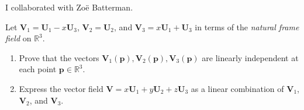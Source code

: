 \documentclass[12 pt, letterpaper]{hmcpset}
\begin{document}
I collaborated with Zo\"{e} Batterman.

\begin{problem}[Problem 1.]
	Let $\mathbf V_1 = \mathbf U_1 - x \mathbf U_3$, $\mathbf V_2 = \mathbf U_2$, and $\mathbf V_3 = x \mathbf U_1 + \mathbf U_3$ in terms of the \textit{natural frame field} on $\mathbb R^3$.
	\begin{enumerate}
		\item Prove that the vectors $\mathbf V_1 (\mathbf p), \mathbf V_2(\mathbf p), \mathbf V_3(\mathbf p)$ are linearly independent at each point $\mathbf p \in \mathbb R^3$.
		\item Express the vector field $\mathbf V  = x \mathbf U_1 + y \mathbf U_2 + z \mathbf U_3$ as a linear combination of $\mathbf V_1$, $\mathbf V_2$, and $\mathbf V_3$.
	\end{enumerate}
\end{problem}
\end{document}
